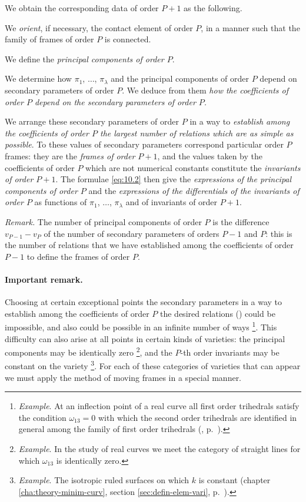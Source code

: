 \somespace

We obtain the corresponding data of order $P+1$ as the following.

We \emph{orient}, if necessary, the contact element of order $P$, in a manner such that the family of frames of order $P$ is connected.

We define the \emph{principal components of order $P$}.

We determine how $\pi_{1}$, $\dots$, $\pi_{\lambda}$ and the principal components of order $P$ depend on secondary parameters of order $P$. We deduce from them \emph{how the coefficients of order $P$ depend on the secondary parameters of order $P$.}

We arrange these secondary parameters of order $P$ in a way to \emph{establish among the coefficients of order $P$ the largest number of relations which are as simple as possible}. To these values of secondary parameters correspond particular order $P$ frames: they are the \emph{frames of order $P+1$}, and the values taken by the coefficients of order $P$ which are not numerical constants constitute the \emph{invariants of order $P+1$}. The formulae \eqref{eq:10.2} then give the \emph{expressions of the principal components of order $P$} and the \emph{expressions of the differentials of the invariants of order $P$} as functions of $\pi_{1}$, $\dots$, $\pi_{\lambda}$ and of invariants of order $P+1$.

\somespace

\emph{Remark.} The number of principal components of order $P$ is the difference $v_{P-1}-v_{P}$ of the number of secondary parameters of orders $P-1$ and $P$: this is the number of relations that we have established among the coefficients of order $P-1$ to define the frames of order $P$.


\paragraph{Important remark.}
\label{sec:130}
Choosing at certain exceptional points the secondary parameters in a way to establish among the coefficients of order $P$ the desired relations () could be impossible, and also could be possible in an infinite number of ways \footnote{\emph{Example}. At an inflection point of a real curve all first order trihedrals satisfy the condition $\omega_{13}=0$ with which the second order trihedrals are identified in general among the family of first order trihedrals (, p.~\pageref{sec:18}).}. This difficulty can also arise at all points in certain kinds of varieties: the principal components may be identically zero \footnote{\emph{Example}. In the study of real curves we meet the category of straight lines for which $\omega_{13}$ is identically zero.}, and the $P$-th order invariants may be constant on the variety \footnote{\emph{Example}. The isotropic ruled surfaces on which $k$ is constant (chapter \ref{cha:theory-minim-curv}, section \ref{sec:defin-elem-vari}, p.~\pageref{sec:defin-elem-vari}).}. For each of these categories of varieties that can appear we must apply the method of moving frames in a special manner.

